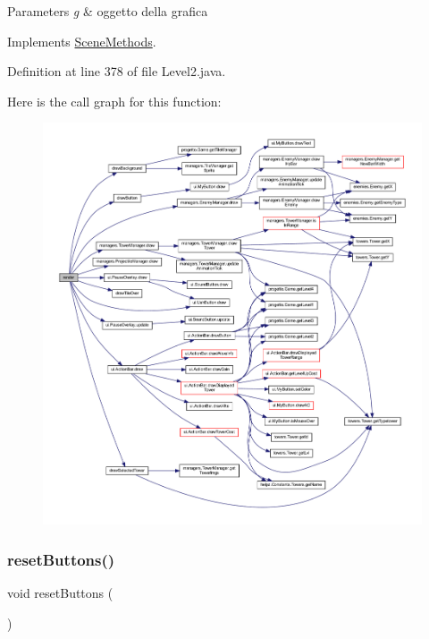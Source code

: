 \begin{DoxyParams}{Parameters}
{\em g} & oggetto della grafica \\
\hline
\end{DoxyParams}


Implements \hyperlink{interfacescenes_1_1_scene_methods_a203b6ad9d5e4d54dd1152986eec4dedc}{Scene\+Methods}.



Definition at line 378 of file Level2.\+java.

Here is the call graph for this function\+:
\nopagebreak
\begin{figure}[H]
\begin{center}
\leavevmode
\includegraphics[width=350pt]{classscenes_1_1_level2_a203b6ad9d5e4d54dd1152986eec4dedc_cgraph}
\end{center}
\end{figure}
\mbox{\label{classscenes_1_1_level2_a548cf4795e9d559d0c0cce0bb57a5251}} 
\subsubsection{\texorpdfstring{reset\+Buttons()}{resetButtons()}}
{\footnotesize\ttfamily void reset\+Buttons (\begin{DoxyParamCaption}{ }\end{DoxyParamCaption})\hspace{0.3cm}{\ttfamily [private]}}



